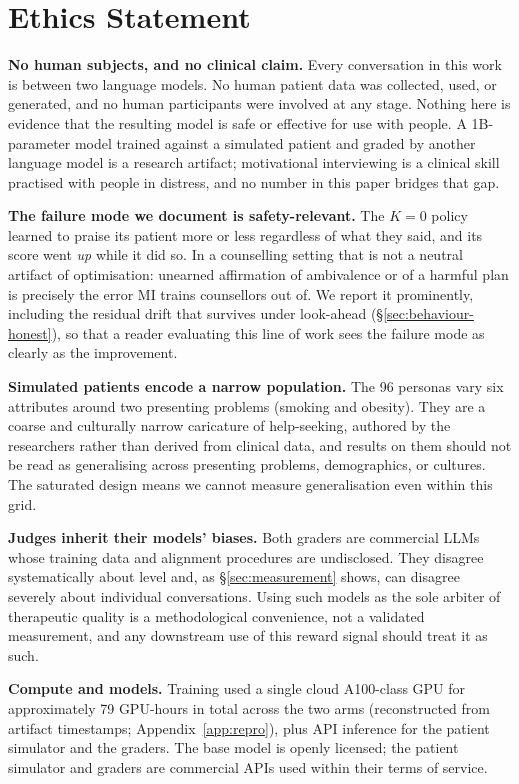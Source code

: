 \section*{Ethics Statement}

\textbf{No human subjects, and no clinical claim.} Every conversation in this work is between two
language models. No human patient data was collected, used, or generated, and no human participants
were involved at any stage. Nothing here is evidence that the resulting model is safe or effective
for use with people. A 1B-parameter model trained against a simulated patient and graded by another
language model is a research artifact; motivational interviewing is a clinical skill practised with
people in distress, and no number in this paper bridges that gap.

\textbf{The failure mode we document is safety-relevant.} The $K{=}0$ policy learned to praise its
patient more or less regardless of what they said, and its score went \emph{up} while it did so. In
a counselling setting that is not a neutral artifact of optimisation: unearned affirmation of
ambivalence or of a harmful plan is precisely the error MI trains counsellors out of. We report it
prominently, including the residual drift that survives under look-ahead
(\S\ref{sec:behaviour-honest}), so that a reader evaluating this line of work sees the failure mode
as clearly as the improvement.

\textbf{Simulated patients encode a narrow population.} The 96 personas vary six attributes around
two presenting problems (smoking and obesity). They are a coarse and culturally narrow caricature
of help-seeking, authored by the researchers rather than derived from clinical data, and results on
them should not be read as generalising across presenting problems, demographics, or cultures. The
saturated design means we cannot measure generalisation even within this grid.

\textbf{Judges inherit their models' biases.} Both graders are commercial LLMs whose training data
and alignment procedures are undisclosed. They disagree systematically about level and, as
\S\ref{sec:measurement} shows, can disagree severely about individual conversations. Using such
models as the sole arbiter of therapeutic quality is a methodological convenience, not a validated
measurement, and any downstream use of this reward signal should treat it as such.

\textbf{Compute and models.} Training used a single cloud A100-class GPU for approximately 79
GPU-hours in total across the two arms (reconstructed from artifact timestamps;
Appendix~\ref{app:repro}), plus API inference for the patient simulator and the graders. The base
model is openly licensed; the patient simulator and graders are commercial APIs used within their
terms of service.
